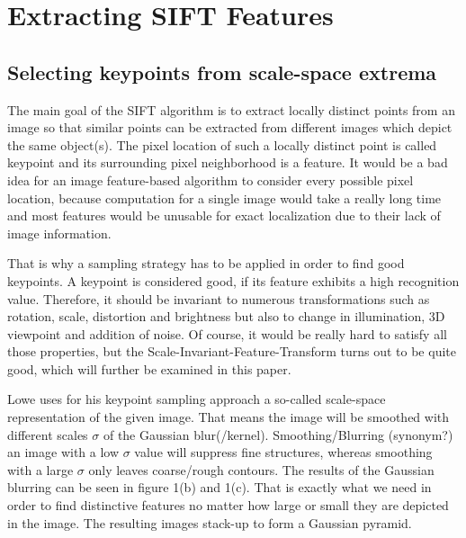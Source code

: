 \documentclass{article}
\begin{document}
	
	
	
	\section{Extracting SIFT Features}		
	\subsection{Selecting keypoints from scale-space extrema}
	
	The main goal of the SIFT algorithm is to extract locally distinct points from an image so that similar points can be extracted from different images which depict the same object(s). 
	The pixel location of such a locally distinct point is called keypoint and its surrounding pixel neighborhood is a feature. It would be a bad idea for an image feature-based algorithm to consider every possible pixel location, because computation for a single image would take a really long time and most features would be unusable for exact localization due to their lack of image information. 
	
	That is why a sampling strategy has to be applied in order to find good keypoints. A keypoint is considered good, if its feature exhibits a high recognition value. Therefore, it should be invariant to numerous transformations such as rotation, scale, distortion and brightness but also to change in illumination, 3D viewpoint and addition of noise. Of course, it would be really hard to satisfy all those properties, but the Scale-Invariant-Feature-Transform turns out to be quite good, which will further be examined in this paper.
	
	Lowe uses for his keypoint sampling approach a so-called scale-space representation of the given image. That means the image will be smoothed with different scales $\sigma$ of the Gaussian blur(/kernel). Smoothing/Blurring (synonym?) an image with a low $\sigma$ value will suppress fine structures, whereas smoothing with a large $\sigma$ only leaves coarse/rough contours. The results of the Gaussian blurring can be seen in figure 1(b) and 1(c). That is exactly what we need in order to find distinctive features no matter how large or small they are depicted in the image. The resulting images stack-up to form a Gaussian pyramid.
	
\end{document}

